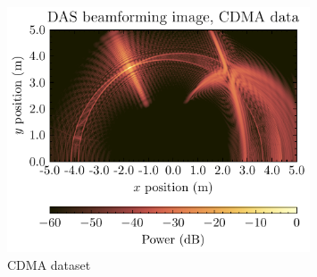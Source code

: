 \documentclass[UKenglish,8pt,aspectratio=1610]{beamer}
\begin{document}
\begin{frame}
\begin{columns}
\begin{column}{0.5\textwidth}
\begin{figure}[h!]
			\includegraphics[width=0.8\textwidth]{question3/CDMA_DAS_image.pdf}
			\centering
			\caption{CDMA dataset}
		\end{figure}
	\end{column}
\end{columns}
\end{frame}
\end{document}
